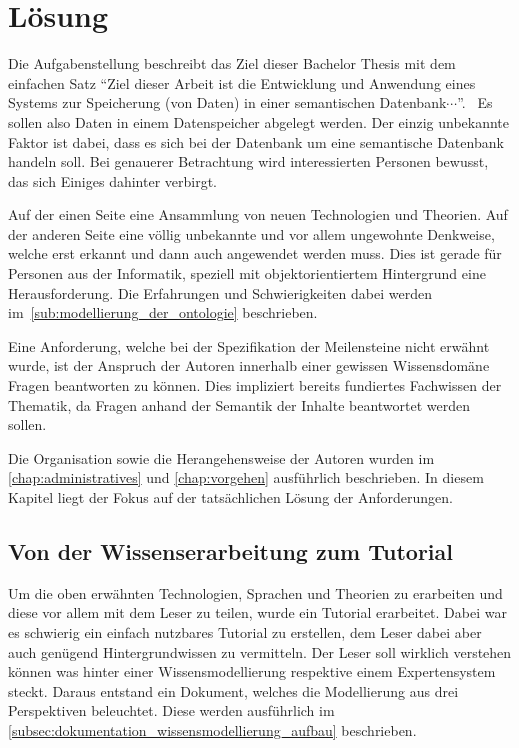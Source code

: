 \chapter{Lösung}
\label{chap:loesung}
Die Aufgabenstellung beschreibt das Ziel dieser Bachelor Thesis mit dem einfachen Satz ``Ziel dieser Arbeit ist die Entwicklung und Anwendung eines Systems zur Speicherung (von Daten) in einer semantischen Datenbank$\cdots$''.~\cite{Aufgabenstellung} Es sollen also Daten in einem Datenspeicher abgelegt werden. Der einzig unbekannte Faktor ist dabei, dass es sich bei der Datenbank um eine semantische Datenbank handeln soll. Bei genauerer Betrachtung wird interessierten Personen bewusst, das sich Einiges dahinter verbirgt.

Auf der einen Seite eine Ansammlung von neuen Technologien und Theorien. Auf der anderen Seite eine völlig unbekannte und vor allem ungewohnte Denkweise, welche erst erkannt und dann auch angewendet werden muss. Dies ist gerade für Personen aus der Informatik, speziell mit objektorientiertem Hintergrund eine Herausforderung. Die Erfahrungen und Schwierigkeiten dabei werden im~\autoref{sub:modellierung_der_ontologie} beschrieben.

Eine Anforderung, welche bei der Spezifikation der Meilensteine nicht erwähnt wurde, ist der Anspruch der Autoren innerhalb einer gewissen Wissensdomäne Fragen beantworten zu können. Dies impliziert bereits fundiertes Fachwissen der Thematik, da Fragen anhand der Semantik der Inhalte beantwortet werden sollen. 

Die Organisation sowie die Herangehensweise der Autoren wurden im \autoref{chap:administratives} und \autoref{chap:vorgehen} ausführlich beschrieben. In diesem Kapitel liegt der Fokus auf der tatsächlichen Lösung der Anforderungen.

\section{Von der Wissenserarbeitung zum Tutorial}
\label{sec:loesung_tutorial}
Um die oben erwähnten Technologien, Sprachen und Theorien zu erarbeiten und diese vor allem mit dem Leser zu teilen, wurde ein Tutorial erarbeitet. Dabei war es schwierig ein einfach nutzbares Tutorial zu erstellen, dem Leser dabei aber auch genügend Hintergrundwissen zu vermitteln. Der Leser soll wirklich verstehen können was hinter einer Wissensmodellierung respektive einem Expertensystem steckt. Daraus entstand ein Dokument, welches die Modellierung aus drei Perspektiven beleuchtet. Diese werden ausführlich im \autoref{subsec:dokumentation_wissensmodellierung_aufbau} beschrieben.

